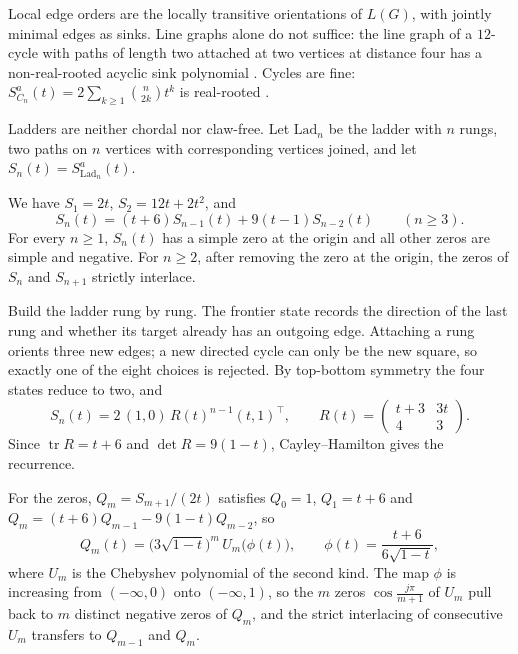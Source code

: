 Local edge orders are the locally transitive orientations of $L(G)$, with
jointly minimal edges as sinks.  Line graphs alone do not suffice: the line
graph of a $12$-cycle with paths of length two attached at two vertices at
distance four has a non-real-rooted acyclic sink polynomial
\cite[Ex.~3.20]{AlexanderssonLeite2026x}.  Cycles are fine:
$S^a_{C_n}(t)=2\sum_{k\geq1}\binom{n}{2k}t^k$ is real-rooted
\cite[Prop.~3.21]{AlexanderssonLeite2026x}.

Ladders are neither chordal nor claw-free.  Let $\mathrm{Lad}_n$ be the ladder
with $n$ rungs, two paths on $n$ vertices with corresponding vertices
joined, and let $S_n(t)=S^a_{\mathrm{Lad}_n}(t)$.

\begin{theorem}[Alexandersson, 2026]
\label{ladderSinkPolynomials}
We have $S_1=2t$, $S_2=12t+2t^2$, and
\[
 S_n(t)=(t+6)S_{n-1}(t)+9(t-1)S_{n-2}(t)\qquad(n\geq3).
\]
For every $n\geq1$, $S_n(t)$ has a simple zero at the origin and all other
zeros are simple and negative.  For $n\geq2$, after removing the zero at the
origin, the zeros of $S_n$ and $S_{n+1}$ strictly interlace.
\end{theorem}

\begin{proof*}
Build the ladder rung by rung.  The frontier state records the direction of
the last rung and whether its target already has an outgoing edge.  Attaching
a rung orients three new edges; a new directed cycle can only be the new
square, so exactly one of the eight choices is rejected.  By top-bottom
symmetry the four states reduce to two, and
\[
 S_n(t)=2\,(1,0)\,R(t)^{n-1}(t,1)^{\top},\qquad
 R(t)=\begin{pmatrix}t+3&3t\\4&3\end{pmatrix}.
\]
Since $\operatorname{tr}R=t+6$ and $\det R=9(1-t)$, Cayley--Hamilton gives the
recurrence.

For the zeros, $Q_m=S_{m+1}/(2t)$ satisfies $Q_0=1$, $Q_1=t+6$ and
$Q_m=(t+6)Q_{m-1}-9(1-t)Q_{m-2}$, so
\[
 Q_m(t)=\bigl(3\sqrt{1-t}\bigr)^m\,U_m\bigl(\phi(t)\bigr),\qquad
 \phi(t)=\frac{t+6}{6\sqrt{1-t}},
\]
where $U_m$ is the Chebyshev polynomial of the second kind.  The map $\phi$
is increasing from $(-\infty,0)$ onto $(-\infty,1)$, so the $m$ zeros
$\cos\frac{j\pi}{m+1}$ of $U_m$ pull back to $m$ distinct negative zeros of
$Q_m$, and the strict interlacing of consecutive $U_m$ transfers to
$Q_{m-1}$ and $Q_m$.
\end{proof*}

